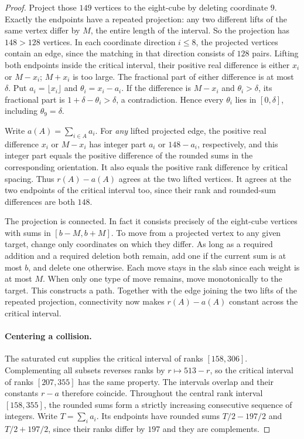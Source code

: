 \documentclass[11pt,letterpaper]{article}
\begin{document}
\begin{proof}
Project those $149$ vertices to the eight-cube by deleting
coordinate $9$. Exactly the endpoints have a repeated projection:
any two different lifts of the same vertex differ by $M$, the entire
length of the interval. So the projection has $148>128$ vertices.
In each coordinate direction $i\le8$, the projected vertices
contain an edge, since the matching in that direction consists of
$128$ pairs. Lifting both endpoints inside the critical interval,
their positive real difference is either $x_i$ or $M-x_i$;
$M+x_i$ is too large. The fractional part of either difference is
at most $\delta$. Put $a_i=\lfloor x_i\rfloor$ and
$\theta_i=x_i-a_i$. If the difference is $M-x_i$ and
$\theta_i>\delta$, its fractional part is
$1+\delta-\theta_i>\delta$, a contradiction. Hence every
$\theta_i$ lies in $[0,\delta]$, including $\theta_9=\delta$.

Write $a(A)=\sum_{i\in A}a_i$. For \emph{any} lifted
projected edge, the positive real difference $x_i$ or $M-x_i$
has integer part $a_i$ or $148-a_i$, respectively, and this
integer part equals the positive difference of the rounded sums
in the corresponding orientation. It also equals the positive rank
difference by critical spacing. Thus $r(A)-a(A)$ agrees at
the two lifted vertices. It agrees at the two endpoints of the
critical interval too, since their rank and rounded-sum
differences are both $148$.

The projection is connected. In fact it consists precisely of
the eight-cube vertices with sums in $[b-M,b+M]$.
To move from a projected vertex to any given target, change only
coordinates on which they differ. As long as a required addition
and a required deletion both remain, add one if the current sum
is at most $b$, and delete one otherwise. Each move stays in
the slab since each weight is at most $M$. When only one type
of move remains, move monotonically to the target. This constructs
a path. Together with the edge joining the two lifts of the
repeated projection, connectivity now makes $r(A)-a(A)$
constant across the critical interval.

\paragraph{Centering a collision.}
The saturated cut supplies the critical interval of ranks
$[158,306]$. Complementing all subsets reverses ranks by
$r\mapsto513-r$, so the critical interval of ranks $[207,355]$
has the same property. The intervals overlap and their constants
$r-a$ therefore coincide. Throughout the central rank interval
$[158,355]$, the rounded sums form a strictly increasing consecutive
sequence of integers. Write $T=\sum_i a_i$. Its endpoints have
rounded sums $T/2-197/2$ and $T/2+197/2$, since their
ranks differ by $197$ and they are complements.


\end{proof}
\end{document}
